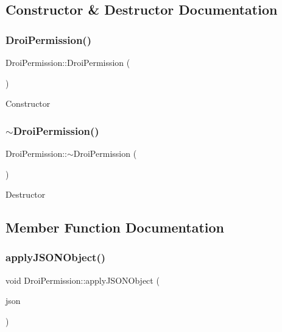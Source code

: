\subsection{Constructor \& Destructor Documentation}
\mbox{\label{class_droi_permission_ad80e955e6343a75f2044e8c9077a99e0}} 
\subsubsection{\texorpdfstring{Droi\+Permission()}{DroiPermission()}}
{\footnotesize\ttfamily Droi\+Permission\+::\+Droi\+Permission (\begin{DoxyParamCaption}{ }\end{DoxyParamCaption})}

Constructor \mbox{\label{class_droi_permission_abe688f88339b09bd55b114ab3aab552a}} 
\subsubsection{\texorpdfstring{$\sim$\+Droi\+Permission()}{~DroiPermission()}}
{\footnotesize\ttfamily Droi\+Permission\+::$\sim$\+Droi\+Permission (\begin{DoxyParamCaption}{ }\end{DoxyParamCaption})}

Destructor 

\subsection{Member Function Documentation}
\mbox{\label{class_droi_permission_a5f8732404c7f3b227179cbcf8467b2c2}} 
\subsubsection{\texorpdfstring{apply\+J\+S\+O\+N\+Object()}{applyJSONObject()}}
{\footnotesize\ttfamily void Droi\+Permission\+::apply\+J\+S\+O\+N\+Object (\begin{DoxyParamCaption}\item[{\hyperlink{structc_j_s_o_n}{c\+J\+S\+ON} $\ast$}]{json }\end{DoxyParamCaption})}

